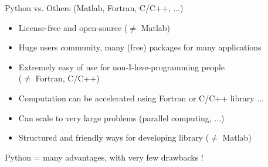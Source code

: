 \documentclass[11pt,unknownkeysallowed,usenames,dvipsnames]{beamer}
\begin{document}
	\begin{frame}{Python vs. Others (Matlab, Fortran, C/C++, ...)}
        \begin{itemize}
            \item License-free and open-source ($\neq$ Matlab)
            \item Huge users community, many (free) packages for many applications
            \item Extremely easy of use for non-I-love-programming people \\ ($\neq$ Fortran, C/C++)
            \item Computation can be accelerated using Fortran or C/C++
            library ... 
            \item Can scale to very large problems (parallel computing, ...)
            \item Structured and friendly ways for developing library ($\neq$ Matlab)
        \end{itemize}
	
		\vspace{10pt}
	
		\begin{center}
            Python = many advantages, with very few drawbacks !
        \end{center}
	\end{frame}
\end{document}
